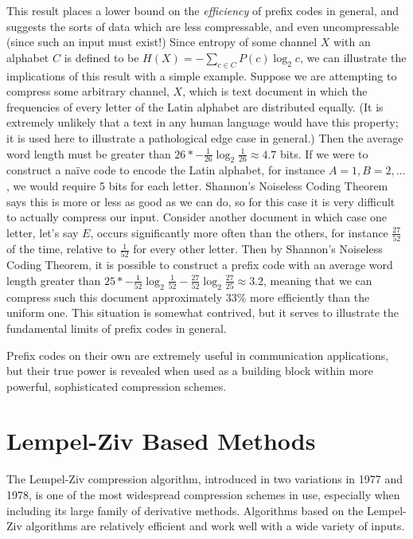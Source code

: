 \documentclass[12pt]{article}
\begin{document}
This result places a lower bound on the \emph{efficiency} of prefix
codes in general, and suggests the sorts of data which are less
compressable, and even uncompressable (since such an input must
exist!) Since entropy of some channel $X$ with an alphabet $C$ is
defined to be $H(X) = -\sum_{c \in C} P(c)\log_2{c}$, we can
illustrate the implications of this result with a simple
example. Suppose we are attempting to compress some arbitrary channel,
$X$, which is text document in which the frequencies of every letter
of the Latin alphabet are distributed equally. (It is extremely
unlikely that a text in any human language would have this property;
it is used here to illustrate a pathological edge case in general.)
Then the average word length must be greater than
$26 * -\frac{1}{26} \log_2{\frac{1}{26}} \approx 4.7$ bits. If we were
to construct a naïve code to encode the Latin alphabet, for instance
$A=1, B=2,...$, we would require 5 bits for each letter. Shannon's
Noiseless Coding Theorem says this is more or less as good as we can
do, so for this case it is very difficult to actually compress our
input. Consider another document in which case one letter, let's say
$E$, occurs significantly more often than the others, for instance
$\frac{27}{52}$ of the time, relative to $\frac{1}{52}$ for every
other letter. Then by Shannon's Noiseless Coding Theorem, it is
possible to construct a prefix code with an average word length
greater than
$25 * -\frac{1}{52} \log_2{\frac{1}{52}} - \frac{27}{52}
\log_2{\frac{27}{25}} \approx 3.2$, meaning that we can compress such
this document approximately $33\%$ more efficiently than the uniform
one. This situation is somewhat contrived, but it serves to illustrate
the fundamental limits of prefix codes in general.

Prefix codes on their own are extremely useful in communication
applications, but their true power is revealed when used as a building
block within more powerful, sophisticated compression schemes.

\section{Lempel-Ziv Based Methods}

The Lempel-Ziv compression algorithm, introduced in two variations in
1977 and 1978, is one of the most widespread compression schemes in
use, especially when including its large family of derivative
methods. Algorithms based on the Lempel-Ziv algorithms are relatively
efficient and work well with a wide variety of inputs.
\end{document}
